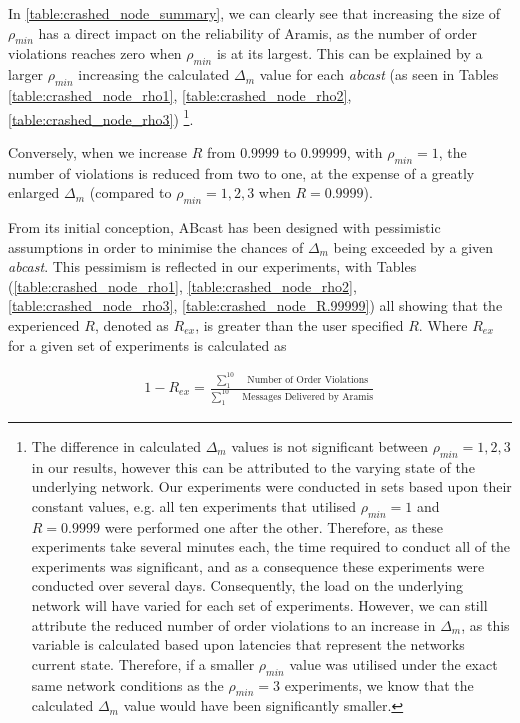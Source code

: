     In \ref{table:crashed_node_summary}, we can clearly see that increasing the size of $\rho_{min}$ has a direct impact on the reliability of \textsf{Aramis}, as the number of order violations reaches zero when $\rho_{min}$ is at its largest.  This can be explained by a larger $\rho_{min}$ increasing the calculated $\Delta_m$ value for each \emph{abcast} (as seen in Tables \ref{table:crashed_node_rho1}, \ref{table:crashed_node_rho2},  \ref{table:crashed_node_rho3}) \footnote{The difference in calculated $\Delta_m$ values is not significant between $\rho_{min}=1,2,3$ in our results, however this can be attributed to the varying state of the underlying network.  Our experiments were conducted in sets based upon their constant values, e.g. all ten experiments that utilised $\rho_{min}=1$ and $R=0.9999$ were performed one after the other.  Therefore, as these experiments take several minutes each, the time required to conduct all of the experiments was significant, and as a consequence these experiments were conducted over several days.  Consequently, the load on the underlying network will have varied for each set of experiments.  However, we can still attribute the reduced number of order violations to an increase in $\Delta_m$, as this variable is calculated based upon latencies that represent the networks current state.  Therefore, if a smaller $\rho_{min}$ value was utilised under the exact same network conditions as the $\rho_{min}=3$ experiments, we know that the calculated $\Delta_m$ value would have been significantly smaller.}.  
    
    Conversely, when we increase $R$ from $0.9999$ to $0.99999$, with $\rho_{min} = 1$, the number of violations is reduced from two to one, at the expense of a greatly enlarged $\Delta_m$ (compared to $\rho_{min}=1,2,3$ when $R=0.9999$).  
    
    From its initial conception, \textsf{ABcast} has been designed with pessimistic assumptions in order to minimise the chances of $\Delta_m$ being exceeded by a given \emph{abcast}.  This pessimism is reflected in our experiments, with Tables (\ref{table:crashed_node_rho1}, \ref{table:crashed_node_rho2},  \ref{table:crashed_node_rho3}, \ref{table:crashed_node_R.99999}) all showing that the experienced $R$, denoted as $R_{ex}$, is greater than the user specified $R$.  Where $R_{ex}$ for a given set of experiments is calculated as
    
    \begin{equation}\label{eq:afc_mu_norm}
		     \begin{aligned}
		         1 - R_{ex} = \frac{\sum\limits_{1}^{10} \quad \text{ Number of Order Violations}}{\sum\limits_{1}^{10} \quad \text{ Messages Delivered by Aramis}}
		     \end{aligned}
    \end{equation}
    
